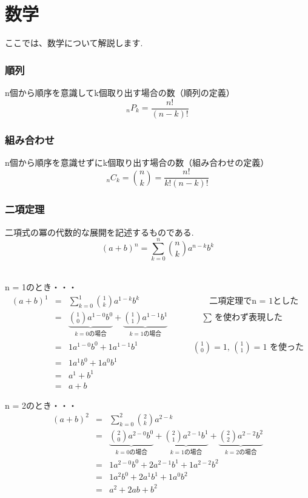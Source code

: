 \documentclass[fleqn,leqno,autodetect-engine,dvipdfmx-if-dvi,ja=standard]{bxjsarticle}
\begin{document}
\newpage

\part{数学}
ここでは、数学について解説します.

\setcounter{section}{0}
\section{順列}

n個から順序を意識してk個取り出す場合の数（順列の定義）
\[ {}_n P _k  =  \frac{n!}{(n-k)!} \]

\section{組み合わせ}

n個から順序を意識せずにk個取り出す場合の数（組み合わせの定義）
\[ {}_n C _k = \binom nk = \frac{n!}{k!(n-k)!}  
\]

\section{二項定理}

二項式の冪の代数的な展開を記述するものである.
\[
 (a + b)^n = \sum_{k=0}^n \binom nk a^{n-k} b^k
\]

\ \\
n = 1のとき・・・
\begin{eqnarray*}
 (a + b)^1 &=& \sum_{k=0}^1 \binom 1k a^{1-k} b^k \qquad \qquad \qquad \qquad \ \text{二項定理でn = 1とした}\\
  &=& \underbrace{ 
        \binom 10 a^{1-0} b^0
        }_{k = 0の場合}
        +
        \underbrace{
        \binom 11 a^{1-1} b^1
        }_{k = 1の場合} \qquad \qquad \text{$\sum$ を使わず表現した}\\
  &=& 1a^{1-0} b^0 + 1a^{1-1} b^1 \qquad \qquad \qquad \ \ \text{$\binom {1}{0} = 1$,                                                                     
                                                                    $\binom {1}{1} = 1$ を使った}\\
  &=& 1a^1b^0 + 1a^0b^1\\
  &=& a^1 + b^1\\
  &=& a + b
\end{eqnarray*}

n = 2のとき・・・
\begin{eqnarray*}
 (a + b)^2 &=& \sum_{k=0}^2 \binom 2k a^{2-k} \\
  &=& \underbrace{ 
        \binom 20 a^{2-0} b^0
        }_{k = 0の場合}
        +
        \underbrace{
        \binom 21 a^{2-1} b^1
        }_{k = 1の場合} 
        +
        \underbrace{
        \binom 22 a^{2-2} b^2
        }_{k = 2の場合}\\
  &=& 1a^{2-0} b^0 + 2a^{2-1} b^1 + 1a^{2-2} b^2\\                                            &=& 1a^2b^0 + 2a^1b^1 + 1a^0b^2\\
  &=& a^2 + 2ab + b^2
\end{eqnarray*}
\end{document}
